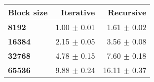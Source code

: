 \begin{tabular}{lrr}\toprule
\textbf{Block size}  & \textbf{Iterative} & \textbf{Recursive}\\\midrule
\textbf{8192}  & 1.00 $\pm$ 0.01 & 1.61 $\pm$ 0.02\\
\textbf{16384}  & 2.15 $\pm$ 0.05 & 3.56 $\pm$ 0.08\\
\textbf{32768}  & 4.78 $\pm$ 0.15 & 7.60 $\pm$ 0.18\\
\textbf{65536} & 9.88 $\pm$ 0.24 & 16.11 $\pm$ 0.37\\
\bottomrule
\end{tabular}
